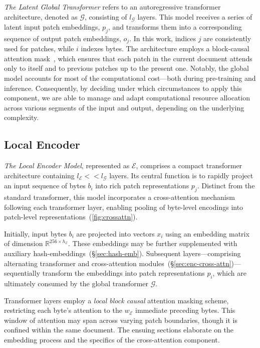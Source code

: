 \textit{The Latent Global Transformer} refers to an autoregressive transformer architecture, denoted as $\mathcal{G}$, consisting of $l_{\mathcal{G}}$ layers. This model receives a series of latent input patch embeddings, $p_j$, and transforms them into a corresponding sequence of output patch embeddings, $o_j$. In this work, indices $j$ are consistently used for patches, while $i$ indexes bytes. The architecture employs a block-causal attention mask~\citep{dubey2024llama}, which ensures that each patch in the current document attends only to itself and to previous patches up to the present one. Notably, the global model accounts for most of the computational cost—both during pre-training and inference. Consequently, by deciding under which circumstances to apply this component, we are able to manage and adapt computational resource allocation across various segments of the input and output, depending on the underlying complexity.

\subsection{Local Encoder}
\label{section:local}

\textit{The Local Encoder Model}, represented as $\mathcal{E}$, comprises a compact transformer architecture containing $l_{\mathcal{E}} << l_{\mathcal{G}}$ layers. Its central function is to rapidly project an input sequence of bytes $b_i$ into rich patch representations $p_j$. Distinct from the standard transformer, this model incorporates a cross-attention mechanism following each transformer layer, enabling pooling of byte-level encodings into patch-level representations~(\autoref{fig:crossattn}). 

Initially, input bytes $b_i$ are projected into vectors $x_i$ using an embedding matrix of dimension $\mathbb{R}^{256 \times h_{\mathcal{E}}}$. These embeddings may be further supplemented with auxiliary hash-embeddings~(\S\ref{sec:hash-emb}). Subsequent layers—comprising alternating transformer and cross-attention modules~(\S\ref{sec:enc-cross-attn})—sequentially transform the embeddings into patch representations $p_i$, which are ultimately consumed by the global transformer $\mathcal{G}$.

Transformer layers employ a \textit{local block causal} attention masking scheme, restricting each byte’s attention to the $w_{\mathcal{E}}$ immediate preceding bytes. This window of attention may span across varying patch boundaries, though it is confined within the same document. The ensuing sections elaborate on the embedding process and the specifics of the cross-attention component.

